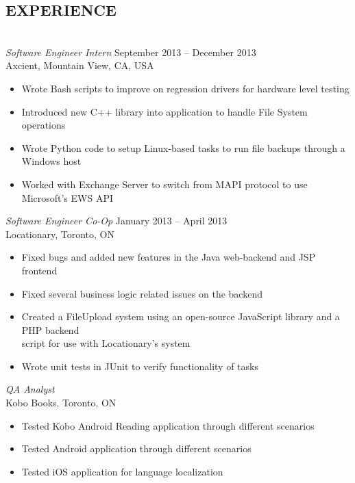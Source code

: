 \documentclass[a4paper, letterpaper]{res}
\newcommand{\tab}[1]{\hspace{.2\textwidth}\rlap{#1}}
\begin{document}
\begin{resume}
\section{EXPERIENCE} 
				~\\[-2mm]
				{\sl Software Engineer Intern} \hspace*{2.6in}September 2013 -- December 2013  \\
				Axcient, Mountain View, CA, USA
                 \begin{itemize}  \itemsep -2pt %
                 \item Wrote Bash scripts to improve on regression drivers for hardware level testing
                 \item Introduced new C++ library into application to handle File System operations
                 \item Wrote Python code to setup Linux-based tasks to run file backups through a Windows host
                 \item Worked with Exchange Server to switch from MAPI protocol to use Microsoft's EWS API
                 \end{itemize} 
				{\sl Software Engineer Co-Op} \hspace*{3in}January 2013 -- April 2013 \\
				Locationary, Toronto, ON 
                 \begin{itemize}  \itemsep -2pt %
                 \item Fixed bugs and added new features in the Java web-backend and JSP frontend
                 \item Fixed several business logic related issues on the backend
                \item Created a FileUpload system using an open-source JavaScript library and a PHP backend\\ script for use with Locationary's system
                \item Wrote unit tests in JUnit to verify functionality of tasks
                \end{itemize}
                {\sl QA Analyst}             \tab{\tab{\tab{May 2012 -- August 2012}}} \\
		          Kobo Books, Toronto, ON
                   \begin{itemize}  \itemsep -2pt %
                  \item Tested Kobo Android Reading application through different scenarios
                  \item Tested Android application through different scenarios
                   \item Tested iOS application for language localization
                   \end{itemize} 
 

\end{resume}
\end{document}
